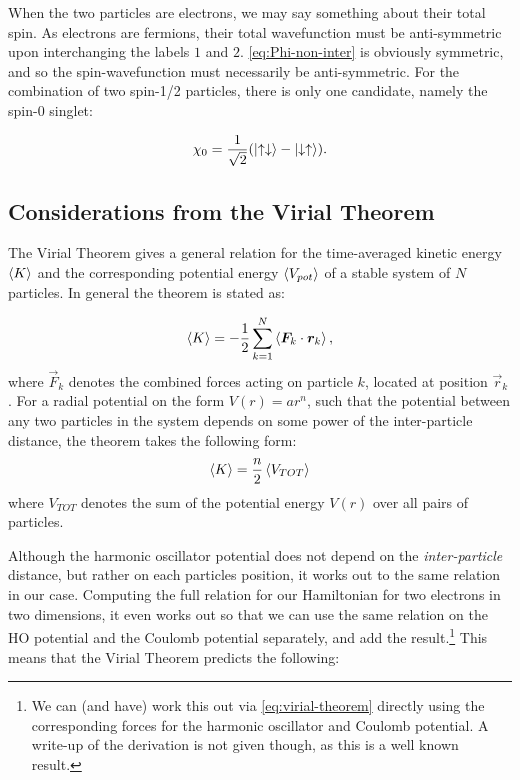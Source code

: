 \documentclass[a4paper, 11pt]{article}
\begin{document}
\begin{multicols}{2}
    When the two particles are electrons, we may say something about their total
    spin. As electrons are fermions, their total wavefunction must be
    anti-symmetric upon interchanging the labels $1$ and $2$.
    \autoref{eq:Phi-non-inter} is obviously symmetric, and so the
    spin-wavefunction must necessarily be anti-symmetric. For the combination of
    two spin-1/2 particles, there is only one candidate, namely the spin-0
    singlet:

    \begin{align}
        \chi_0 = \frac{1}{\sqrt 2}\qty(\ket{\uparrow\downarrow} -
        \ket{\downarrow\uparrow}).
    \end{align}

    \subsection{Considerations from the Virial Theorem}

    The Virial Theorem gives a general relation for the time-averaged kinetic
    energy $\expval{K}$ and the corresponding potential energy
    $\expval{V_{pot}}$ of a stable system of $N$ particles. In general the
    theorem is stated as:

    \begin{align}
        \expval{K} = -\frac{1}{2}\sum_{k=1}^N \expval{\bm F_k \cdot \bm r_k},\label{eq:virial-theorem}
    \end{align}
    where $\vec F_k$ denotes the combined forces acting on particle $k$, located
    at position $\vec r_k$. For a radial potential on the form $V(r)=ar^n$, such
    that the potential between any two particles in the system depends on some
    power of the inter-particle distance, the
    theorem takes the following form:
    \begin{align}
        \expval{K} = \frac{n}{2}\expval{V_{TOT}}
    \end{align}
    where $V_{TOT}$ denotes the sum of the potential energy $V(r)$ over all
    pairs of particles. 

    Although the harmonic oscillator potential does not depend on the
    \emph{inter-particle} distance, but rather on each particles position, it
    works out to the same relation in our case. Computing the full relation for
    our Hamiltonian for two electrons in two dimensions, it even works out so
    that we can use the same relation on the HO potential and the Coulomb
    potential separately, and add the result.\footnote{We can (and have) work this out
    via \autoref{eq:virial-theorem} directly using the corresponding forces for
    the harmonic oscillator and Coulomb potential. A write-up of the derivation is not given
    though, as this is a well known result.} This means that the Virial Theorem
    predicts the following\cite{Katriel2012}:


\end{multicols}
\end{document}
